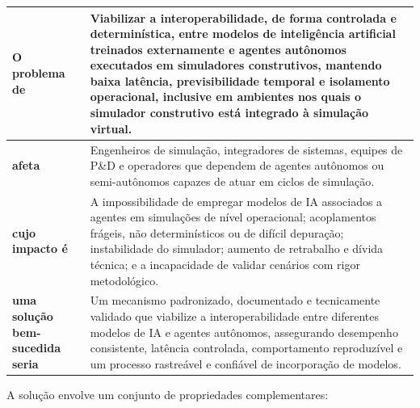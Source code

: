 \begin{table}[h]
    \begin{tabular}{|p{}|p{}|}
        \hline
            \textbf{O problema de} &
            Viabilizar a interoperabilidade, de forma controlada e determinística, entre modelos de inteligência artificial treinados externamente e agentes autônomos executados em simuladores construtivos, mantendo baixa latência, previsibilidade temporal e isolamento operacional, inclusive em ambientes nos quais o simulador construtivo está integrado à simulação virtual. \\
        \hline
            \textbf{afeta} &
            Engenheiros de simulação, integradores de sistemas, equipes de P\&D e operadores que dependem de agentes autônomos ou semi-autônomos capazes de atuar em ciclos de simulação. \\
        \hline
            \textbf{cujo impacto é} &
            A impossibilidade de empregar modelos de IA associados a agentes em simulações de nível operacional; acoplamentos frágeis, não determinísticos ou de difícil depuração; instabilidade do simulador; aumento de retrabalho e dívida técnica; e a incapacidade de validar cenários com rigor metodológico. \\
        \hline
            \textbf{uma solução bem-sucedida seria} &
            Um mecanismo padronizado, documentado e tecnicamente validado que viabilize a interoperabilidade entre diferentes modelos de IA e agentes autônomos, assegurando desempenho consistente, latência controlada, comportamento reproduzível e um processo rastreável e confiável de incorporação de modelos. \\
        \hline
    \end{tabular}
\end{table}

A solução envolve um conjunto de propriedades complementares:

